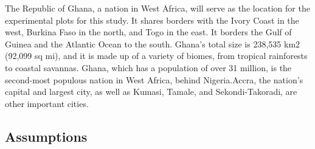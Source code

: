 \documentclass[12pt,a4paper]{book}
\begin{document}
{The Republic of Ghana, a nation in West Africa, will serve as the
location for the experimental plots for this study. It shares borders
with the Ivory Coast in the west, Burkina Faso in the north, and Togo in
the east. It borders the Gulf of Guinea and the Atlantic Ocean to the
south. Ghana's total size is 238,535 km2 (92,099 sq mi), and it is made
up of a variety of biomes, from tropical rainforests to coastal
savannas. Ghana, which has a population of over 31 million, is the
second-most populous nation in West Africa, behind Nigeria.Accra, the
nation's capital and largest city, as well as Kumasi, Tamale, and
Sekondi-Takoradi, are other important cities.

\hypertarget{assumptions}{%
\subsection{Assumptions}\label{assumptions}}

\begin{Shaded}
\begin{Highlighting}[]
\OtherTok{\textless{}{-}} \NormalTok{(}\NormalTok{)}
\OtherTok{\textless{}{-}} \NormalTok{(}\NormalTok{)}\SpecialCharTok{\%\textgreater{}\%}
  \SpecialCharTok{\%\textgreater{}\%}
  \SpecialCharTok{\%\textgreater{}\%}
  \NormalTok{(}

\SpecialCharTok{\%\textgreater{}\%}
\NormalTok{(}\NormalTok{(}\NormalTok{,} \OtherTok{=} \NormalTok{,}\OtherTok{=} \NormalTok{))}\SpecialCharTok{\%\textgreater{}\%}
  \NormalTok{(} \NormalTok{(}\NormalTok{))}
\end{Highlighting}
\end{Shaded}

}
\end{document}
